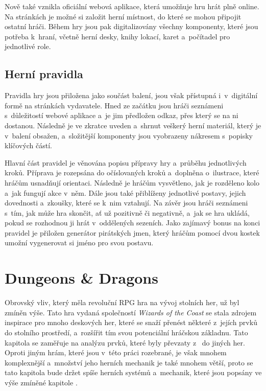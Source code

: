 Nově také vznikla oficiální webová aplikace, která umožňuje hru hrát plně online. Na stránkách je možné si založit herní místnost, do které se mohou připojit ostatní hráči. Během hry jsou pak digitalizovány všechny komponenty, které jsou potřeba k~hraní, včetně herní desky, knihy lokací, karet a~počítadel pro jednotlivé role. \cite{fw_remote_app}

\subsection{Herní pravidla}
\label{subsec:fw_rules}

Pravidla hry  jsou přiložena jako součást balení, jsou však přístupná i~v~digitální formě na stránkách vydavatele. Hned ze začátku jsou hráči seznámeni s~důležitostí webové aplikace a~je jim předložen odkaz, přes který se na ni dostanou. Následně je ve zkratce uveden a~shrnut veškerý herní materiál, který je v~balení obsažen, a~složitější komponenty jsou vyobrazeny nákresem s~popisky klíčových částí.

Hlavní část pravidel je věnována popisu přípravy hry a~průběhu jednotlivých kroků. Příprava je rozepsána do očíslovaných kroků a~doplněna o~ilustrace, které hráčům usnadňují orientaci. Následně je hráčům vysvětleno, jak je rozděleno kolo a~jak fungují akce v~něm. Dále jsou také přiblíženy jednotlivé postavy, jejich dovednosti a~zkoušky, které se k~nim vztahují. Na závěr jsou hráči seznámeni s~tím, jak může hra skončit, ať už pozitivně či negativně, a~jak se hra ukládá, pokud se rozhodnou ji hrát v~oddělených sezeních. Jako zajímavý bonus na konci pravidel je přiložen generátor pirátských jmen, který hráčům pomocí dvou kostek umožní vygenerovat si jméno pro svou postavu.



\section{Dungeons \& Dragons}
\label{sec:dungeons_and_dragons}

Obrovský vliv, který měla revoluční RPG hra  na vývoj stolních her, už byl zmíněn výše. Tato hra vydaná společností \textit{Wizards of the Coast} se stala zdrojem inspirace pro mnoho deskových her, které se snaží přenést některé z~jejích prvků do stolního prostředí, a~rozšířit tím svou potenciální hráčskou základnu. Tato kapitola se zaměřuje na analýzu prvků, které byly převzaty z~\dnd{} do jiných her. Oproti jiným hrám, které jsou v~této práci rozebrané, je však \dnd{} mnohem komplexnější a~množství jeho herních mechanik je také mnohem větší, proto se tato kapitola bude držet spíše herních systémů a~mechanik, které jsou popsány ve výše zmíněné kapitole \textit{}. \cite{dnd_beyond_2023}


